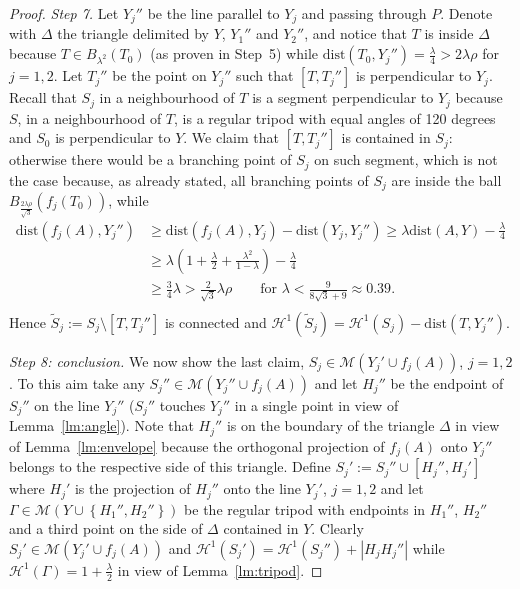 \documentclass{amsart}
\renewcommand{\H}{\mathcal H}
\newcommand{\abs}[1]{\left\vert #1 \right\vert}
\newcommand{\enclose}[1]{\left(#1\right)}
\newcommand{\ENCLOSE}[1]{\left\{#1\right\}}
\newcommand{\M}{\mathcal{M}}
\renewcommand{\H}{\mathcal{H}}
\newcommand{\dist}{\mathrm{dist}}
\theoremstyle{definition}
\theoremstyle{remark}
\begin{document}
\begin{proof}
  \emph{Step 7.}
  Let $Y_j''$ be the line parallel to $Y_j$ and passing through $P$.
  Denote with $\Delta$ the triangle delimited by $Y$, $Y_1''$ and $Y_2''$,
  and notice that $T$ is inside $\Delta$ because $T\in B_{\lambda^2}(T_0)$
  (as proven in Step~5)
  while $\dist(T_0, Y_j'') = \frac{\lambda}{4}>2\lambda\rho$ for $j=1,2$.
  Let $T_j''$ be the point on $Y_j''$ such that $[T,T_j'']$ is perpendicular
  to $Y_j$. 
  Recall that $S_j$ in a neighbourhood of $T$ is a segment perpendicular 
  to $Y_j$ because $S$, in a neighbourhood of $T$, 
  is a regular tripod with equal angles of 120 degrees 
  and $S_0$ is perpendicular to $Y$.
  We claim that $[T,T_j'']$ is contained in $S_j$: otherwise there would 
  be a branching point of $S_j$ on such segment, which is not the case because,
  as already stated, all branching points of $S_j$ are inside 
  the ball $B_{\frac{2\lambda \rho}{\sqrt 3}}(f_j(T_0))$, while
  \begin{align*}
    \dist(f_j(A), Y_j'') 
    &\ge \dist(f_j(A), Y_j) - \dist(Y_j, Y_j'')
    \ge \lambda \dist(A,Y) - \frac{\lambda}{4}  \\
    & \ge \lambda \enclose{1 + \frac \lambda 2 + \frac{\lambda^2}{1-\lambda}} - \frac \lambda 4 \\ 
    & \ge \frac 3 4 \lambda
    > \frac 2 {\sqrt 3}\lambda\rho
    \qquad \text{for $\lambda < \frac{9}{8\sqrt 3+9}\approx 0.39$}. \\
  \end{align*}
  Hence $\tilde S_j:= S_j\setminus [T,T_j'']$ is connected and 
  $\H^1(\tilde S_j)=\H^1(S_j) - \dist(T,Y_j'')$.

  \emph{Step 8: conclusion.}
  We now show the last claim, $S_j \in \M(Y_j'\cup f_j(A))$, $j=1,2$.
  To this aim take any $S_j''\in \M(Y_j''\cup f_j (A))$ and let $H_j''$ be the 
  endpoint of $S_j''$ on the line $Y_j''$ ($S_j''$ touches $Y_j''$ in a single point 
  in view of Lemma~\ref{lm:angle}). 
  Note that $H_j''$ is on the boundary of the triangle $\Delta$ 
  in view of Lemma~\ref{lm:envelope} 
  because the orthogonal 
  projection of $f_j(A)$ onto $Y_j''$ belongs to the respective side of this triangle.
  Define $S_j':= S_j''\cup [H_j'',H_j']$ where $H_j'$ is the projection of $H_j''$ 
  onto the line $Y_j'$, $j=1,2$ and let $\Gamma\in \M(Y\cup \ENCLOSE{H_1'',H_2''})$
  be the regular tripod with endpoints in $H_1''$, $H_2''$ and a third point on 
  the side of $\Delta$ contained in $Y$.
  Clearly $S_j'\in \M(Y_j'\cup f_j(A))$ and $\H^1(S_j')=\H^1(S_j'') + \abs{H_j H_j''}$
  while $\H^1(\Gamma) = 1+\frac \lambda 2$ in view of Lemma~\ref{lm:tripod}.


\end{proof}
\end{document}
